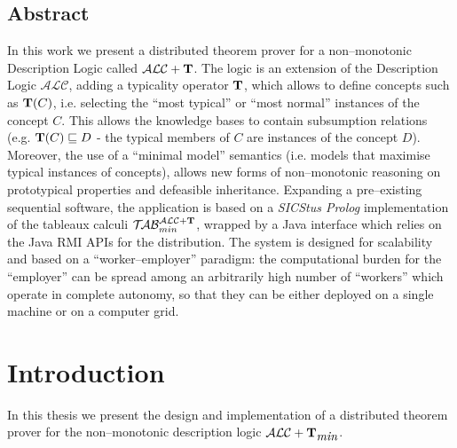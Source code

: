\documentclass[a4paper, 11pt, oneside]{duthesis}
\newcommand{\tip}{{\bf T}}
\newcommand{\alc}{\mathcal{ALC}}
\newcommand{\alct}{\mathcal{ALC}+\tip}
\newcommand{\alctmin}{\mathcal{ALC}+\tip_{\mbox{\em min}}}
\newcommand{\nuovoc}{\mathrel{{\mathcal{T}\!\mathcal{AB}}}_{min}^{\mathcal{ALC}+\mbox{\scriptsize $\tip$}}}
\begin{document}

\section*{Abstract}

In this work we present a distributed theorem prover for a non--monotonic Description Logic called $\alct$.
The logic is an extension of the Description Logic $\alc$, adding a typicality operator $\tip$, which allows to define concepts such as $\tip(C)$, i.e. selecting the ``most typical'' or ``most normal'' instances of the concept $C$. This allows the knowledge bases to contain subsumption relations (e.g. $\tip(C) \sqsubseteq D$ - the typical members of $C$ are instances of the concept $D$). Moreover, the use of a ``minimal model'' semantics (i.e. models that maximise typical instances of concepts), allows new forms of non--monotonic reasoning on prototypical properties and defeasible inheritance.
Expanding a pre--existing sequential software, the application is based on a \emph{SICStus Prolog} implementation of the tableaux calculi $\nuovoc$, wrapped by a Java interface which relies on the Java RMI APIs for the distribution.
The system is designed for scalability and based on a ``worker--employer'' paradigm: the computational burden for the ``employer'' can be spread among an arbitrarily high number of ``workers'' which operate in complete autonomy, so that they can be either deployed on a single machine or on a computer grid.

\newpage


\tableofcontents

\newpage


\chapter{Introduction}

In this thesis we present the design and implementation of a distributed theorem prover for the non--monotonic description logic $\alctmin$.
\end{document}
